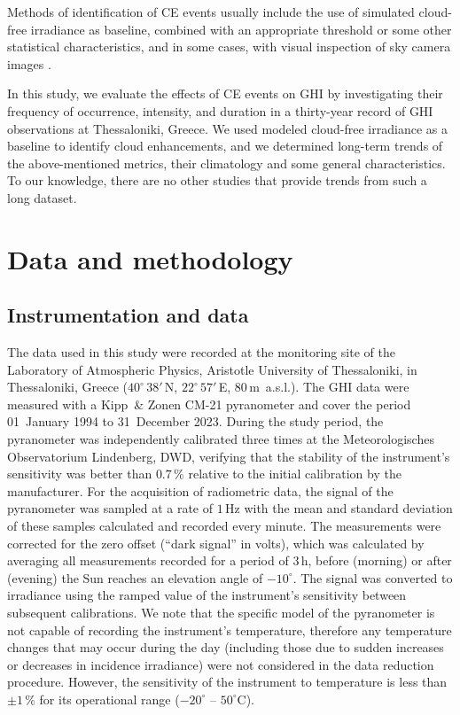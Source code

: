 \documentclass[preprint, 5p,
authoryear]{elsarticle} %
\begin{document}
Methods of identification of CE events usually include the use of
simulated cloud-free irradiance as baseline, combined with an
appropriate threshold or some other statistical characteristics, and in
some cases, with visual inspection of sky camera images \citep[ and
references therein]{Vamvakas2020, Mol2023}.

In this study, we evaluate the effects of CE events on GHI by
investigating their frequency of occurrence, intensity, and duration in
a thirty-year record of GHI observations at Thessaloniki, Greece. We
used modeled cloud-free irradiance as a baseline to identify cloud
enhancements, and we determined long-term trends of the above-mentioned
metrics, their climatology and some general characteristics. To our
knowledge, there are no other studies that provide trends from such a
long dataset.

\hypertarget{data-and-methodology}{%
\section{Data and methodology}\label{data-and-methodology}}

\hypertarget{instrumentation-and-data}{%
\subsection{Instrumentation and data}\label{instrumentation-and-data}}

The data used in this study were recorded at the monitoring site of the
Laboratory of Atmospheric Physics, Aristotle University of Thessaloniki,
in Thessaloniki, Greece (\(40^\circ\,38'\,\)N, \(22^\circ\,57'\,\)E,
\(80\,\)m~a.s.l.). The GHI data were measured with a Kipp~\& Zonen CM-21
pyranometer and cover the period 01~January 1994 to 31~December 2023.
During the study period, the pyranometer was independently calibrated
three times at the Meteorologisches Observatorium Lindenberg, DWD,
verifying that the stability of the instrument's sensitivity was better
than \(0.7\,\%\) relative to the initial calibration by the
manufacturer. For the acquisition of radiometric data, the signal of the
pyranometer was sampled at a rate of \(1\,\text{Hz}\) with the mean and
standard deviation of these samples calculated and recorded every
minute. The measurements were corrected for the zero offset (``dark
signal'' in volts), which was calculated by averaging all measurements
recorded for a period of \(3\,\text{h}\), before (morning) or after
(evening) the Sun reaches an elevation angle of \(-10^\circ\). The
signal was converted to irradiance using the ramped value of the
instrument's sensitivity between subsequent calibrations. We note that
the specific model of the pyranometer is not capable of recording the
instrument's temperature, therefore any temperature changes that may
occur during the day (including those due to sudden increases or
decreases in incidence irradiance) were not considered in the data
reduction procedure. However, the sensitivity of the instrument to
temperature is less than \(\pm1\,\%\) for its operational range
(\(-20^\circ\) -- \(50^\circ\)C).
\end{document}
